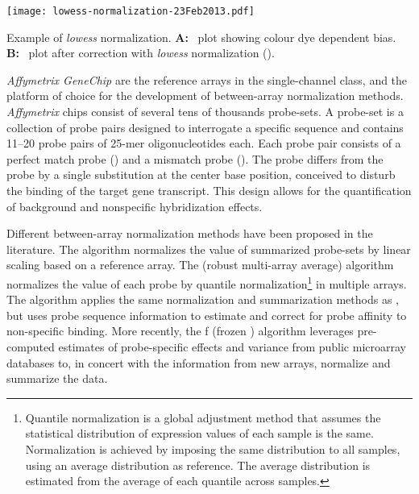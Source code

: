 \begin{marginfigure}[-4.2cm]%
  \begin{center}
    \texttt{[image: lowess-normalization-23Feb2013.pdf]}
    \caption[\emph{Lowess} normalization]{Example of \emph{lowess}
      normalization.  \textbf{A:}~ plot showing colour dye
      dependent bias.  \textbf{B:}~ plot after correction with
      \emph{lowess} normalization (\citealp{yang_normalization_2002}).}
    \label{fig:ma-plot}%
  \end{center}
\end{marginfigure}

\emph{Affymetrix GeneChip} are the reference arrays in the single-channel class,
and the platform of choice for the development of between-array normalization
methods.  \emph{Affymetrix} chips consist of several tens of thousands
probe-sets.  A probe-set is a collection of probe pairs designed to interrogate
a specific sequence and contains \numrange{11}{20} probe pairs of 25-mer
oligonucleotides each.  Each probe pair consists of a perfect match probe
() and a mismatch probe ().  The 
probe differs from the  probe by a single substitution at the
center base position, conceived to disturb the binding of the target gene
transcript.  This design allows for the quantification of background and
nonspecific hybridization effects.

Different between-array normalization methods have been proposed in the
literature.  The  algorithm\cite{hubbell_robust_2002} normalizes
the value of summarized probe-sets by linear scaling based on a reference array.
The  (robust multi-array average)
algorithm\cite{irizarry_exploration_2003} normalizes the value of each probe by
quantile normalization\footnote{Quantile normalization is a global adjustment
  method that assumes the statistical distribution of expression values of each
  sample is the same.  Normalization is achieved by imposing the same
  distribution to all samples, using an average distribution as reference.  The
  average distribution is estimated from the average of each quantile across
  samples.} in multiple arrays.  The 
algorithm\cite{wu_model-based_2004} applies the same normalization and
summarization methods as , but uses probe sequence information to
estimate and correct for probe affinity to non-specific binding.  More recently,
the f (frozen ) algorithm\cite{mccall_frozen_2010}
leverages pre-computed estimates of probe-specific effects and variance from
public microarray databases to, in concert with the information from new arrays,
normalize and summarize the data.

